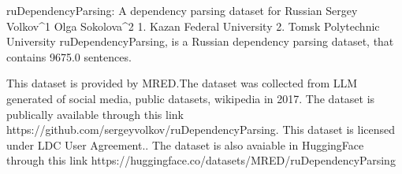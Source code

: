 
ruDependencyParsing: A dependency parsing dataset for Russian
Sergey Volkov^1 Olga Sokolova^2
1. Kazan Federal University 2. Tomsk Polytechnic University
ruDependencyParsing, is a Russian dependency parsing dataset, that contains 9675.0 sentences.

This dataset is provided by MRED.The dataset was collected from LLM generated of social media, public datasets, wikipedia in 2017. 
The dataset is publically available through this link https://github.com/sergeyvolkov/ruDependencyParsing. This dataset is licensed under LDC User Agreement..
The dataset is also avaiable in HuggingFace through this link https://huggingface.co/datasets/MRED/ruDependencyParsing
